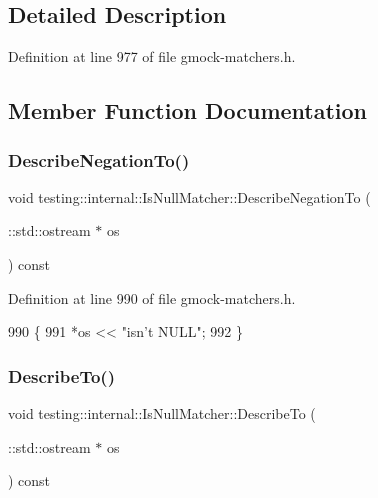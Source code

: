 \subsection{Detailed Description}


Definition at line 977 of file gmock-\/matchers.\+h.



\subsection{Member Function Documentation}
\mbox{\label{classtesting_1_1internal_1_1IsNullMatcher_a8349e2d6cef08303be7f2471f330a7c0}} 
\subsubsection{\texorpdfstring{Describe\+Negation\+To()}{DescribeNegationTo()}}
{\footnotesize\ttfamily void testing\+::internal\+::\+Is\+Null\+Matcher\+::\+Describe\+Negation\+To (\begin{DoxyParamCaption}\item[{\+::std\+::ostream $\ast$}]{os }\end{DoxyParamCaption}) const\hspace{0.3cm}{\ttfamily [inline]}}



Definition at line 990 of file gmock-\/matchers.\+h.


\begin{DoxyCode}
990                                                 \{
991     *os << \textcolor{stringliteral}{"isn't NULL"};
992   \}
\end{DoxyCode}
\mbox{\label{classtesting_1_1internal_1_1IsNullMatcher_a81c0b31d64bc65b5573bb56bbc3f4af8}} 
\subsubsection{\texorpdfstring{Describe\+To()}{DescribeTo()}}
{\footnotesize\ttfamily void testing\+::internal\+::\+Is\+Null\+Matcher\+::\+Describe\+To (\begin{DoxyParamCaption}\item[{\+::std\+::ostream $\ast$}]{os }\end{DoxyParamCaption}) const\hspace{0.3cm}{\ttfamily [inline]}}



